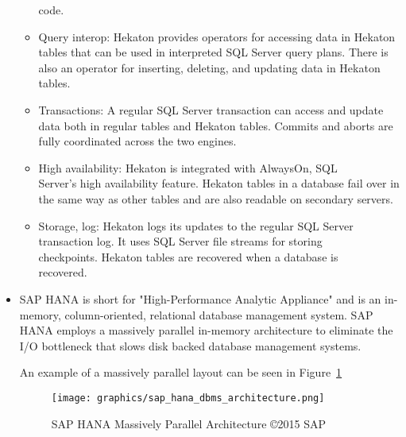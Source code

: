 \documentclass[letterpaper, 11pt]{article}
\begin{document}
\begin{itemize}
\begin{itemize}
  code.
  \item Query interop: Hekaton provides operators for accessing data
  in Hekaton tables that can be used in interpreted SQL Server
  query plans. There is also an operator for inserting, deleting,
  and updating data in Hekaton tables.
  \item Transactions: A regular SQL Server transaction can access
  and update data both in regular tables and Hekaton tables.
  Commits and aborts are fully coordinated across the two engines.
  \item High availability: Hekaton is integrated with AlwaysOn,
  SQL \\ Server’s high availability feature. Hekaton tables in a database
  fail over in the same way as other tables and are also
  readable on secondary servers.
  \item Storage, log: Hekaton logs its updates to the regular SQL
  Server transaction log. It uses SQL Server file streams for storing \\
  checkpoints. Hekaton tables are recovered when a database is \\ recovered.
  \end{itemize} \cite{hekaton}

  \item SAP HANA is short for "High-Performance Analytic Appliance" and is an in-memory,
  column-oriented, relational database management system. SAP HANA employs a
  massively parallel in-memory architecture to eliminate the I/O bottleneck
  that slows disk backed database management systems.
  \par\vspace{\baselineskip}
  An example of a massively parallel layout can be seen in Figure~\ref{fig:saphana_architecture}
  \begin{figure}[H]
	\centering
	\texttt{[image: graphics/sap\_hana\_dbms\_architecture.png]}
	\caption{SAP HANA Massively Parallel Architecture \copyright 2015 SAP \citep{saphana}}
	\label{fig:saphana_architecture}	
  \end{figure}
  \par\vspace{\baselineskip}
\end{itemize}

\newpage
\end{document}
